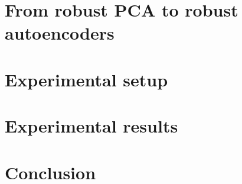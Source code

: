 \documentclass[runningheads,a4paper]{llncs}
\begin{document}
\section{From robust PCA to robust autoencoders}
\label{sec:method}


\section{Experimental setup}
\label{sec:experiment-setup}


\section{Experimental results}
\label{sec:experiment-results}


\section{Conclusion}
\label{sec:conclusion}




\end{document}
